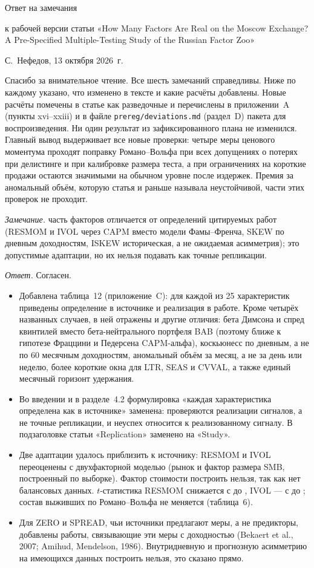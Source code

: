 \documentclass[11pt]{article}
\newcommand{\point}[1]{\par\vspace{10pt}{\large #1}\par\vspace{2pt}}
\newcommand{\remark}[1]{\textit{Замечание.} #1\par}
\newcommand{\answer}{\textit{Ответ.} }
\newcommand{\RW}{Романо--Вольфа}
\begin{document}
{\Large Ответ на замечания}\par\vspace{4pt}
к рабочей версии статьи «How Many Factors Are Real on the Moscow Exchange? A Pre-Specified Multiple-Testing
Study of the Russian Factor Zoo»\par
С.~Нефедов, 13 октября 2026~г.

\vspace{6pt}
Спасибо за внимательное чтение. Все шесть замечаний справедливы. Ниже по каждому указано, что изменено в
тексте и какие расчёты добавлены. Новые расчёты помечены в статье как разведочные и перечислены в приложении~A
(пункты xvi--xxiii) и в файле \texttt{prereg/deviations.md} (раздел~D) пакета для воспроизведения. Ни один
результат из зафиксированного плана не изменился. Главный вывод выдерживает все новые проверки: четыре меры
ценового моментума проходят поправку \RW{} при всех допущениях о потерях при делистинге и при калибровке размера
теста, а при ограничениях на короткие продажи остаются значимыми на обычном уровне после издержек. Премия за аномальный объём, которую статья и раньше называла
неустойчивой, части этих проверок не проходит.

\point{1. Определения факторов}
\remark{часть факторов отличается от определений цитируемых работ (RESMOM и IVOL через CAPM вместо модели
Фамы--Френча, SKEW по дневным доходностям, ISKEW историческая, а не ожидаемая асимметрия); это допустимые
адаптации, но их нельзя подавать как точные репликации.}
\answer Согласен.
\begin{itemize}
\item Добавлена таблица~12 (приложение~C): для каждой из 25 характеристик приведены определение в источнике и
реализация в работе. Кроме четырёх названных случаев, в ней отражены и другие отличия: бета Димсона и спред
квинтилей вместо бета-нейтрального портфеля BAB (поэтому ближе к гипотезе Фраццини и Педерсена CAPM-альфа),
коскьюнесс по дневным, а не по 60 месячным доходностям, аномальный объём за месяц, а не за день или неделю,
более короткие окна для LTR, SEAS и CVVAL, а также единый месячный горизонт удержания.
\item Во введении и в разделе~4.2 формулировка «каждая характеристика определена как в источнике» заменена:
проверяются реализации сигналов, а не точные репликации, и неуспех относится к реализованному сигналу. В
подзаголовке статьи «Replication» заменено на «Study».
\item Две адаптации удалось приблизить к источнику: RESMOM и IVOL переоценены с двухфакторной моделью (рынок и
фактор размера SMB, построенный по выборке). Фактор стоимости построить нельзя, так как нет балансовых данных.
$t$-статистика RESMOM снижается с  до , IVOL --- с  до ;
состав выживших по \RW{} не меняется (таблица~6).
\item Для ZERO и SPREAD, чьи источники предлагают меры, а не предикторы, добавлены работы, связывающие эти меры с
доходностью (Bekaert et al., 2007; Amihud, Mendelson, 1986). Внутридневную и прогнозную асимметрию на имеющихся
данных построить нельзя, это сказано прямо.
\end{itemize}
\end{document}
